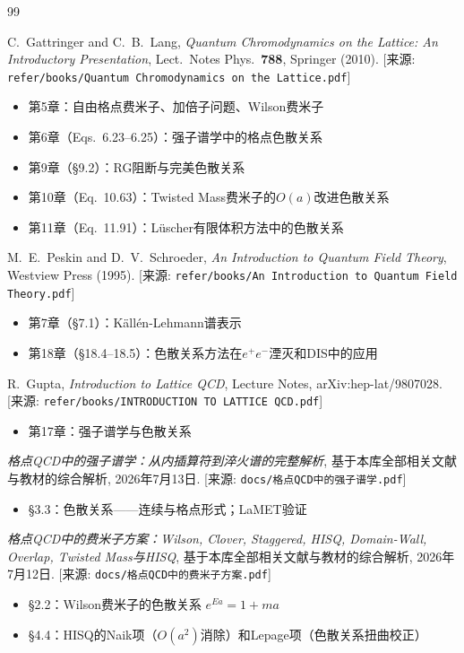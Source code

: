 \documentclass[12pt,a4paper]{ctexart}
\theoremstyle{definition}
\begin{document}
\begin{thebibliography}{99}

C.~Gattringer and C.~B.~Lang,
\textit{Quantum Chromodynamics on the Lattice: An Introductory Presentation},
Lect.\ Notes Phys.\ \textbf{788}, Springer (2010).
[来源: \texttt{refer/books/Quantum Chromodynamics on the Lattice.pdf}]
\begin{itemize}
    \item 第5章：自由格点费米子、加倍子问题、Wilson费米子
    \item 第6章（Eqs.~6.23--6.25）：强子谱学中的格点色散关系
    \item 第9章（§9.2）：RG阻断与完美色散关系
    \item 第10章（Eq.~10.63）：Twisted Mass费米子的$O(a)$改进色散关系
    \item 第11章（Eq.~11.91）：L\"uscher有限体积方法中的色散关系
\end{itemize}

M.~E.~Peskin and D.~V.~Schroeder,
\textit{An Introduction to Quantum Field Theory},
Westview Press (1995).
[来源: \texttt{refer/books/An Introduction to Quantum Field Theory.pdf}]
\begin{itemize}
    \item 第7章（§7.1）：K\"all\'en-Lehmann谱表示
    \item 第18章（§18.4--18.5）：色散关系方法在$e^+e^-$湮灭和DIS中的应用
\end{itemize}

R.~Gupta,
\textit{Introduction to Lattice QCD},
Lecture Notes, arXiv:hep-lat/9807028.
[来源: \texttt{refer/books/INTRODUCTION TO LATTICE QCD.pdf}]
\begin{itemize}
    \item 第17章：强子谱学与色散关系
\end{itemize}

\textit{格点QCD中的强子谱学：从内插算符到淬火谱的完整解析},
基于本库全部相关文献与教材的综合解析, 2026年7月13日.
[来源: \texttt{docs/格点QCD中的强子谱学.pdf}]
\begin{itemize}
    \item §3.3：色散关系——连续与格点形式；LaMET验证
\end{itemize}

\textit{格点QCD中的费米子方案：Wilson, Clover, Staggered, HISQ, Domain-Wall, Overlap, Twisted Mass与HISQ},
基于本库全部相关文献与教材的综合解析, 2026年7月12日.
[来源: \texttt{docs/格点QCD中的费米子方案.pdf}]
\begin{itemize}
    \item §2.2：Wilson费米子的色散关系 $e^{Ea} = 1 + ma$
    \item §4.4：HISQ的Naik项（$O(a^2)$消除）和Lepage项（色散关系扭曲校正）
\end{itemize}


\end{thebibliography}
\end{document}
